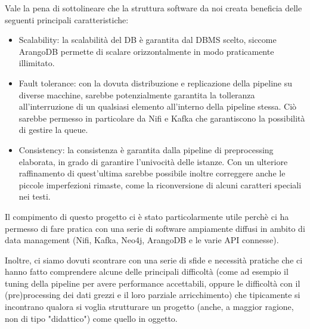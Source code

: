 \documentclass[fleqn,10pt]{SelfArx} %
\begin{document}
{Vale la pena di sottolineare che la struttura software da noi creata beneficia delle seguenti principali caratteristiche:
\begin{itemize}
\item Scalability: la scalabilità del DB è garantita dal DBMS scelto, siccome ArangoDB permette di scalare orizzontalmente in modo praticamente illimitato.
\item Fault tolerance: con la dovuta distribuzione e replicazione della pipeline su diverse macchine, sarebbe potenzialmente garantita la tolleranza all'interruzione di un qualsiasi elemento all'interno della pipeline stessa. Ciò sarebbe permesso in particolare da Nifi e Kafka che garantiscono la possibilità di gestire la queue.
\item Consistency: la consistenza è garantita dalla pipeline di preprocessing elaborata, in grado di garantire l'univocità delle istanze. Con un ulteriore raffinamento di quest'ultima sarebbe possibile inoltre correggere anche le piccole imperfezioni rimaste, come la riconversione di alcuni caratteri speciali nei testi.
\end{itemize}

Il compimento di questo progetto ci è stato particolarmente utile perchè ci ha permesso di fare pratica con una serie di software ampiamente diffusi in ambito di data management (Nifi, Kafka, Neo4j, ArangoDB e le varie API connesse). 

Inoltre, ci siamo dovuti scontrare con una serie di sfide e necessità pratiche che ci hanno fatto comprendere alcune delle principali difficoltà (come ad esempio il tuning della pipeline per avere performance accettabili, oppure le difficoltà con il (pre)processing dei dati grezzi e il loro parziale arricchimento) che tipicamente si incontrano qualora si voglia strutturare un progetto (anche, a maggior ragione, non di tipo "didattico") come quello in oggetto.
}
\end{document}
